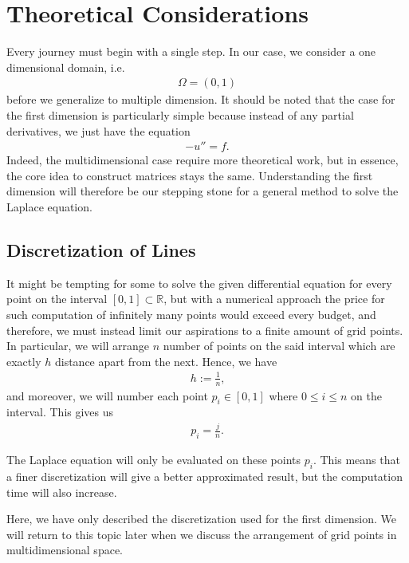 \section{Theoretical Considerations}

Every journey must begin with a single step. In our case, we consider a one dimensional domain, i.e.
\begin{align*}
    \Omega = (0, 1)
\end{align*}
before we generalize to multiple dimension. It should be noted that the case for the first dimension is particularly simple because instead of any partial derivatives, we just have the equation
\begin{align*}
    - u'' = f \text{.}
\end{align*}
Indeed, the multidimensional case require more theoretical work, but in essence, the core idea to construct matrices stays the same. Understanding the first dimension will therefore be our stepping stone for a general method to solve the Laplace equation.

\subsection{Discretization of Lines}

It might be tempting for some to solve the given differential equation for every point on the interval \([0, 1] \subset \mathbb{R}\), but with a numerical approach the price for such computation of infinitely many points would exceed every budget, and therefore, we must instead limit our aspirations to a finite amount of grid points. In particular, we will arrange \(n\) number of points on the said interval which are exactly \(h\) distance apart from the next. Hence, we have
\begin{align*}
	h := \frac{1}{n} \text{,}
\end{align*}
and moreover, we will number each point \(p_i \in [0, 1]\) where \(0 \leq i \leq n\)  on the interval. This gives us
\begin{align*}
	p_i = \frac{j}{n} \text{.}
\end{align*}

The Laplace equation will only be evaluated on these points \(p_i\). This means that a finer discretization will give a better approximated result, but the computation time will also increase.

Here, we have only described the discretization used for the first dimension. We will return to this topic later when we discuss the arrangement of grid points in multidimensional space.


